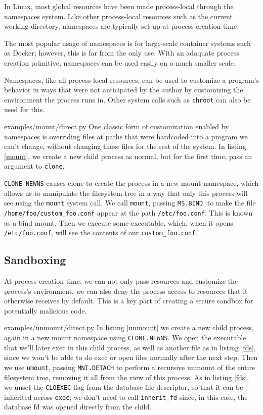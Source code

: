 \documentclass[letterpaper,twocolumn,10pt]{article}
\begin{document}
In Linux, most global resources have been made process-local
through the namespaces system.
Like other process-local resources such as the current working directory,
namespaces are typically set up at process creation time.

The most popular usage of namespaces is for large-scale container systems such as Docker;
however, this is far from the only use.
With an adaquate process creation primitive,
namespaces can be used easily on a much smaller scale.

Namespaces, like all process-local resources,
can be used to customize a program's behavior
in ways that were not anticipated by the author
by customizing the environment the process runs in.
Other system calls such as \texttt{chroot} can also be used for this.


{examples/mount/direct.py}
One classic form of customization enabled by namespaces
is overriding files at paths that were hardcoded into a program we can't change,
without changing those files for the rest of the system.
In listing \ref{mount},
we create a new child process as normal,
but for the first time,
pass an argument to \texttt{clone}.

\verb|CLONE_NEWNS| causes clone to create the process in a new mount namespace,
which allows us to manipulate the filesystem tree in a way that only this process will see
using the \texttt{mount} system call.
We call \texttt{mount}, passing \texttt{MS.BIND}, to make the file \verb|/home/foo/custom_foo.conf|
appear at the path \verb|/etc/foo.conf|.
This is known as a bind mount.
Then we execute some executable,
which, when it opens \verb|/etc/foo.conf|, will see the contents of our \verb|custom_foo.conf|.
\subsection{Sandboxing}
At process creation time,
we can not only pass resources and customize the process's environment,
we can also deny the process access to resources that it otherwise receives by default.
This is a key part of creating a secure sandbox for potentially malicious code.


{examples/unmount/direct.py}
In listing \ref{unmount}
we create a new child process,
again in a new mount namespace using \texttt{CLONE.NEWNS}.
We open the executable that we'll later exec in this child process,
as well as another file as in listing \ref{fds},
since we won't be able to do exec or open files normally after the next step.
Then we use \texttt{umount},
passing \texttt{MNT.DETACH} to perform a recursive unmount of the entire filesystem tree,
removing it all from the view of this process.
As in listing \ref{fds}, we unset the \texttt{CLOEXEC} flag from the database file descriptor,
so that it can be inherited across \texttt{exec};
we don't need to call \verb|inherit_fd| since, in this case, the database fd was opened directly from the child.
\end{document}
